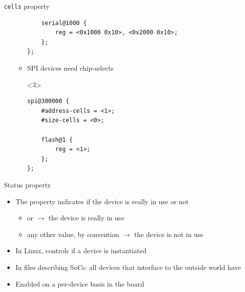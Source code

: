 \begin{frame}[fragile]{{\tt cells} property}
\begin{itemize}
\begin{itemize}
\begin{onlyenv}
\begin{block}{}
\begin{verbatim}
    serial@1000 {
        reg = <0x1000 0x10>, <0x2000 0x10>;
    };
};
\end{verbatim}
        \end{block}
      \end{onlyenv}
      \pause
    \item SPI devices need chip-selects
      \begin{onlyenv}<3>
        \begin{block}{}
\begin{verbatim}
spi@300000 {
    #address-cells = <1>;
    #size-cells = <0>;

    flash@1 {
        reg = <1>;
    };
};
\end{verbatim}
        \end{block}
      \end{onlyenv}
    \end{itemize}
  \end{itemize}
\end{frame}

\begin{frame}{Status property}
  \begin{itemize}
  \item The  property indicates if the device is really in
    use or not
    \begin{itemize}
    \item {} or  $\rightarrow$ the device is really
      in use
    \item any other value, by convention  $\rightarrow$
      the device is not in use
    \end{itemize}
  \item In Linux, controls if a device is instantiated
  \item In  files describing SoCs: all devices that
    interface to the outside world have 
  \item Enabled on a per-device basis in the board 
  \end{itemize}
\end{frame}

